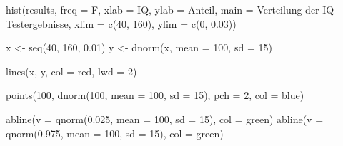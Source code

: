 \documentclass[12pt,a4paper]{article}
\newenvironment{Shaded}{\begin{snugshade}}{\end{snugshade}}
\newcommand{\AttributeTok}[1]{\textcolor[rgb]{0.77,0.63,0.00}{#1}}
\newcommand{\DecValTok}[1]{\textcolor[rgb]{0.00,0.00,0.81}{#1}}
\newcommand{\FloatTok}[1]{\textcolor[rgb]{0.00,0.00,0.81}{#1}}
\newcommand{\FunctionTok}[1]{\textcolor[rgb]{0.00,0.00,0.00}{#1}}
\newcommand{\NormalTok}[1]{#1}
\newcommand{\OtherTok}[1]{\textcolor[rgb]{0.56,0.35,0.01}{#1}}
\newcommand{\StringTok}[1]{\textcolor[rgb]{0.31,0.60,0.02}{#1}}
\begin{document}
\begin{Shaded}
\begin{Highlighting}[]
    \FunctionTok{hist}\NormalTok{(results, }
         \AttributeTok{freq =}\NormalTok{ F, }
         \AttributeTok{xlab =} \StringTok{\textquotesingle{}IQ\textquotesingle{}}\NormalTok{, }
         \AttributeTok{ylab =} \StringTok{\textquotesingle{}Anteil\textquotesingle{}}\NormalTok{, }
         \AttributeTok{main =} \StringTok{\textquotesingle{}Verteilung der IQ{-}Testergebnisse\textquotesingle{}}\NormalTok{, }
         \AttributeTok{xlim =} \FunctionTok{c}\NormalTok{(}\DecValTok{40}\NormalTok{, }\DecValTok{160}\NormalTok{), }
         \AttributeTok{ylim =} \FunctionTok{c}\NormalTok{(}\DecValTok{0}\NormalTok{, }\FloatTok{0.03}\NormalTok{))}
    
\NormalTok{    x }\OtherTok{\textless{}{-}} \FunctionTok{seq}\NormalTok{(}\DecValTok{40}\NormalTok{, }\DecValTok{160}\NormalTok{, }\FloatTok{0.01}\NormalTok{)}
\NormalTok{    y }\OtherTok{\textless{}{-}} \FunctionTok{dnorm}\NormalTok{(x, }\AttributeTok{mean =} \DecValTok{100}\NormalTok{, }\AttributeTok{sd =} \DecValTok{15}\NormalTok{)}
    
    \FunctionTok{lines}\NormalTok{(x, y, }\AttributeTok{col =} \StringTok{\textquotesingle{}red\textquotesingle{}}\NormalTok{, }\AttributeTok{lwd =} \DecValTok{2}\NormalTok{)}
    
    \FunctionTok{points}\NormalTok{(}\DecValTok{100}\NormalTok{, }
           \FunctionTok{dnorm}\NormalTok{(}\DecValTok{100}\NormalTok{, }\AttributeTok{mean =} \DecValTok{100}\NormalTok{, }\AttributeTok{sd =} \DecValTok{15}\NormalTok{), }
           \AttributeTok{pch =} \DecValTok{2}\NormalTok{, }
           \AttributeTok{col =} \StringTok{\textquotesingle{}blue\textquotesingle{}}\NormalTok{)}
    
    \FunctionTok{abline}\NormalTok{(}\AttributeTok{v =} \FunctionTok{qnorm}\NormalTok{(}\FloatTok{0.025}\NormalTok{, }\AttributeTok{mean =} \DecValTok{100}\NormalTok{, }\AttributeTok{sd =} \DecValTok{15}\NormalTok{), }\AttributeTok{col =} \StringTok{\textquotesingle{}green\textquotesingle{}}\NormalTok{)}
    \FunctionTok{abline}\NormalTok{(}\AttributeTok{v =} \FunctionTok{qnorm}\NormalTok{(}\FloatTok{0.975}\NormalTok{, }\AttributeTok{mean =} \DecValTok{100}\NormalTok{, }\AttributeTok{sd =} \DecValTok{15}\NormalTok{), }\AttributeTok{col =} \StringTok{\textquotesingle{}green\textquotesingle{}}\NormalTok{)}
\end{Highlighting}
\end{Shaded}
\end{document}

